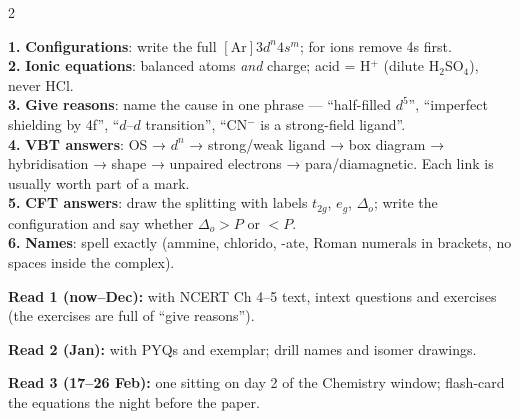 \documentclass[10pt,a4paper]{extarticle}
\begin{document}
\begin{multicols}{2}
\columnbreak
{}
\begin{kbox}\small
\textbf{1.} \textbf{Configurations}: write the full $[\text{Ar}]3d^n4s^m$; for ions remove 4s first.\\
\textbf{2.} \textbf{Ionic equations}: balanced atoms \emph{and} charge; acid = H$^+$ (dilute H$_2$SO$_4$), never HCl.\\
\textbf{3.} \textbf{Give reasons}: name the cause in one phrase — ``half-filled $d^5$'', ``imperfect shielding by 4f'', ``$d$--$d$ transition'', ``CN$^-$ is a strong-field ligand''.\\
\textbf{4.} \textbf{VBT answers}: OS → $d^n$ → strong/weak ligand → box diagram → hybridisation → shape → unpaired electrons → para/diamagnetic. Each link is usually worth part of a mark.\\
\textbf{5.} \textbf{CFT answers}: draw the splitting with labels $t_{2g}$, $e_g$, $\Delta_o$; write the configuration and say whether $\Delta_o>P$ or $<P$.\\
\textbf{6.} \textbf{Names}: spell exactly (ammine, chlorido, -ate, Roman numerals in brackets, no spaces inside the complex).
\end{kbox}
\begin{fl}
\item \textbf{Read 1 (now–Dec):} with NCERT Ch 4--5 text, intext questions and exercises (the exercises are full of ``give reasons'').
\item \textbf{Read 2 (Jan):} with PYQs and exemplar; drill names and isomer drawings.
\item \textbf{Read 3 (17--26 Feb):} one sitting on day 2 of the Chemistry window; flash-card the equations the night before the paper.
\end{fl}
\end{multicols}
\end{document}
